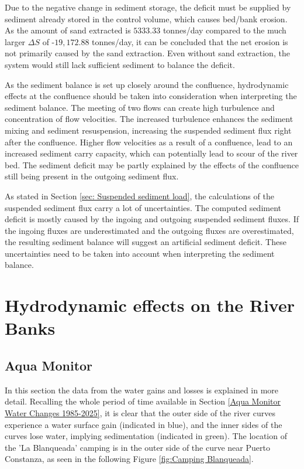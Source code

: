Due to the negative change in sediment storage, the deficit must be supplied by sediment already stored in the control volume, which causes bed/bank erosion. As the amount of sand extracted is $5333.33$ tonnes/day compared to the much larger $\Delta S$ of -$19,172.88$ tonnes/day, it can be concluded that the net erosion is not primarily caused by the sand extraction. Even without sand extraction, the system would still lack sufficient sediment to balance the deficit.

As the sediment balance is set up closely around the confluence, hydrodynamic effects at the confluence should be taken into consideration when interpreting the sediment balance. The meeting of two flows can create high turbulence and concentration of flow velocities. The increased turbulence enhances the sediment mixing and sediment resuspension, increasing the suspended sediment flux right after the confluence. Higher flow velocities as a result of a confluence, lead to an increased sediment carry capacity, which can potentially lead to scour of the river bed. The sediment deficit may be partly explained by the effects of the confluence still being present in the outgoing sediment flux.

As stated in Section \ref{sec: Suspended sediment load}, the calculations of the suspended sediment flux carry a lot of uncertainties. The computed sediment deficit is mostly caused by the ingoing and outgoing suspended sediment fluxes. If the ingoing fluxes are underestimated and the outgoing fluxes are overestimated, the resulting sediment balance will suggest an artificial sediment deficit. These uncertainties need to be taken into account when interpreting the sediment balance.


\section{Hydrodynamic effects on the River Banks}
\subsection{Aqua Monitor}
\label{section:cirtical_location}
In this section the data from the water gains and losses is explained in more detail.
Recalling the whole period of time available in Section \ref{Aqua Monitor Water Changes 1985-2025}, it is clear that the outer side of the river curves experience a water surface gain (indicated in blue), and the inner sides of the curves lose water, implying sedimentation (indicated in green). 
The location of the 'La Blanqueada' camping  is in the outer side of the curve near Puerto Constanza, as seen in the following Figure \ref{fig:Camping Blanqueada}.

